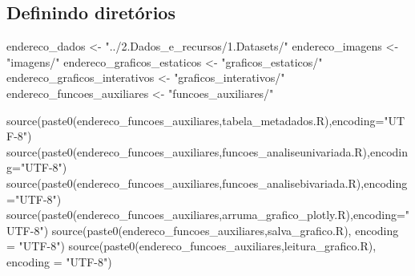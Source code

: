 \documentclass[
]{article}
\newenvironment{Shaded}{\begin{snugshade}}{\end{snugshade}}
\newcommand{\AttributeTok}[1]{\textcolor[rgb]{0.77,0.63,0.00}{#1}}
\newcommand{\FunctionTok}[1]{\textcolor[rgb]{0.00,0.00,0.00}{#1}}
\newcommand{\NormalTok}[1]{#1}
\newcommand{\OtherTok}[1]{\textcolor[rgb]{0.56,0.35,0.01}{#1}}
\newcommand{\StringTok}[1]{\textcolor[rgb]{0.31,0.60,0.02}{#1}}
\begin{document}
\hypertarget{definindo-diretuxf3rios}{%
\subsection{Definindo diretórios}\label{definindo-diretuxf3rios}}

\begin{Shaded}
\begin{Highlighting}[]
\NormalTok{endereco\_dados }\OtherTok{\textless{}{-}} \StringTok{"../2.Dados\_e\_recursos/1.Datasets/"}
\NormalTok{endereco\_imagens }\OtherTok{\textless{}{-}} \StringTok{"imagens/"}
\NormalTok{endereco\_graficos\_estaticos }\OtherTok{\textless{}{-}} \StringTok{"graficos\_estaticos/"} 
\NormalTok{endereco\_graficos\_interativos }\OtherTok{\textless{}{-}} \StringTok{"graficos\_interativos/"}
\NormalTok{endereco\_funcoes\_auxiliares }\OtherTok{\textless{}{-}} \StringTok{"funcoes\_auxiliares/"}
\end{Highlighting}
\end{Shaded}

\begin{Shaded}
\begin{Highlighting}[]
\FunctionTok{source}\NormalTok{(}\FunctionTok{paste0}\NormalTok{(endereco\_funcoes\_auxiliares,}\StringTok{\textquotesingle{}tabela\_metadados.R\textquotesingle{}}\NormalTok{),}\AttributeTok{encoding=}\StringTok{"UTF{-}8"}\NormalTok{)}
\FunctionTok{source}\NormalTok{(}\FunctionTok{paste0}\NormalTok{(endereco\_funcoes\_auxiliares,}\StringTok{\textquotesingle{}funcoes\_analiseunivariada.R\textquotesingle{}}\NormalTok{),}\AttributeTok{encoding=}\StringTok{"UTF{-}8"}\NormalTok{)}
\FunctionTok{source}\NormalTok{(}\FunctionTok{paste0}\NormalTok{(endereco\_funcoes\_auxiliares,}\StringTok{\textquotesingle{}funcoes\_analisebivariada.R\textquotesingle{}}\NormalTok{),}\AttributeTok{encoding=}\StringTok{"UTF{-}8"}\NormalTok{)}
\FunctionTok{source}\NormalTok{(}\FunctionTok{paste0}\NormalTok{(endereco\_funcoes\_auxiliares,}\StringTok{\textquotesingle{}arruma\_grafico\_plotly.R\textquotesingle{}}\NormalTok{),}\AttributeTok{encoding=}\StringTok{"UTF{-}8"}\NormalTok{)}
\FunctionTok{source}\NormalTok{(}\FunctionTok{paste0}\NormalTok{(endereco\_funcoes\_auxiliares,}\StringTok{\textquotesingle{}salva\_grafico.R\textquotesingle{}}\NormalTok{), }\AttributeTok{encoding =} \StringTok{"UTF{-}8"}\NormalTok{)}
\FunctionTok{source}\NormalTok{(}\FunctionTok{paste0}\NormalTok{(endereco\_funcoes\_auxiliares,}\StringTok{\textquotesingle{}leitura\_grafico.R\textquotesingle{}}\NormalTok{), }\AttributeTok{encoding =} \StringTok{"UTF{-}8"}\NormalTok{)}
\end{Highlighting}
\end{Shaded}
\end{document}
